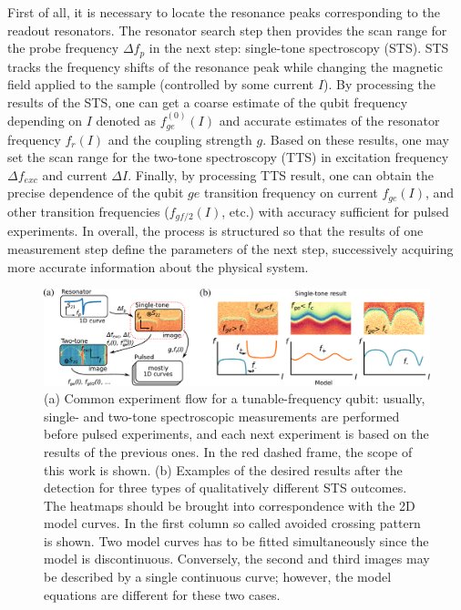 \documentclass[%
 aip,
 draft,
 amsmath,amssymb,
 reprint,%
]{revtex4-1}
\begin{document}
First of all, it is necessary to locate the resonance peaks corresponding to the readout resonators. The resonator search step then provides the scan range for the probe frequency $\Delta f_p$ in the next step: single-tone spectroscopy (STS). STS tracks the frequency shifts of the resonance peak while changing the magnetic field applied to the sample (controlled by some current $I$). By processing the results of the STS, one can get a coarse estimate of the qubit frequency depending on $I$  denoted as  $f^{(0)}_{ge}(I)$ and accurate estimates of the resonator frequency $f_r(I)$ and the coupling strength $g$. Based on these results, one may set the scan range for the two-tone spectroscopy (TTS) in excitation frequency $\Delta f_{exc}$ and current $\Delta I$. Finally, by processing TTS result, one can obtain the precise dependence of the qubit $ge$ transition frequency on current $f_{ge}(I)$, and other transition frequencies ($f_{gf/2}(I)$, etc.) with accuracy sufficient for pulsed experiments. In overall, the process is structured so that the results of one measurement step define the parameters of the next step, successively acquiring more accurate information about the physical system.

\begin{figure}
	\centering
	\includegraphics[width=0.95\linewidth]{detection_sts}
	\caption{(a) Common experiment flow for a tunable-frequency qubit: usually, single- and two-tone spectroscopic measurements are performed before pulsed experiments, and each next experiment is based on the results of the previous ones. In the red dashed frame, the scope of this work is shown. (b) Examples of the desired results after the detection for three types of qualitatively different STS outcomes. The heatmaps should be brought into correspondence with the 2D model curves. In the first column so called avoided crossing pattern is shown. Two model curves has to be fitted simultaneously since the model is discontinuous. Conversely, the second and third images may be described by a single continuous curve; however, the model equations are different for these two cases.}
	\label{fig:detection}	
\end{figure} 
\end{document}
